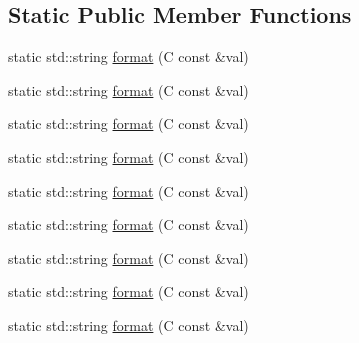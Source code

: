 \subsection*{Static Public Member Functions}
\begin{DoxyCompactItemize}
\item 
static std\+::string \mbox{\hyperlink{structfakeit_1_1Formatter_3_01C_00_01typename_01std_1_1enable__if_3_01is__ostreamable_3_01C_01_4_1_1value_01_4_1_1type_01_4_af196fc780a3f1cfe986246af4c65a718}{format}} (C const \&val)
\item 
static std\+::string \mbox{\hyperlink{structfakeit_1_1Formatter_3_01C_00_01typename_01std_1_1enable__if_3_01is__ostreamable_3_01C_01_4_1_1value_01_4_1_1type_01_4_af196fc780a3f1cfe986246af4c65a718}{format}} (C const \&val)
\item 
static std\+::string \mbox{\hyperlink{structfakeit_1_1Formatter_3_01C_00_01typename_01std_1_1enable__if_3_01is__ostreamable_3_01C_01_4_1_1value_01_4_1_1type_01_4_af196fc780a3f1cfe986246af4c65a718}{format}} (C const \&val)
\item 
static std\+::string \mbox{\hyperlink{structfakeit_1_1Formatter_3_01C_00_01typename_01std_1_1enable__if_3_01is__ostreamable_3_01C_01_4_1_1value_01_4_1_1type_01_4_af196fc780a3f1cfe986246af4c65a718}{format}} (C const \&val)
\item 
static std\+::string \mbox{\hyperlink{structfakeit_1_1Formatter_3_01C_00_01typename_01std_1_1enable__if_3_01is__ostreamable_3_01C_01_4_1_1value_01_4_1_1type_01_4_af196fc780a3f1cfe986246af4c65a718}{format}} (C const \&val)
\item 
static std\+::string \mbox{\hyperlink{structfakeit_1_1Formatter_3_01C_00_01typename_01std_1_1enable__if_3_01is__ostreamable_3_01C_01_4_1_1value_01_4_1_1type_01_4_af196fc780a3f1cfe986246af4c65a718}{format}} (C const \&val)
\item 
static std\+::string \mbox{\hyperlink{structfakeit_1_1Formatter_3_01C_00_01typename_01std_1_1enable__if_3_01is__ostreamable_3_01C_01_4_1_1value_01_4_1_1type_01_4_af196fc780a3f1cfe986246af4c65a718}{format}} (C const \&val)
\item 
static std\+::string \mbox{\hyperlink{structfakeit_1_1Formatter_3_01C_00_01typename_01std_1_1enable__if_3_01is__ostreamable_3_01C_01_4_1_1value_01_4_1_1type_01_4_af196fc780a3f1cfe986246af4c65a718}{format}} (C const \&val)
\item 
static std\+::string \mbox{\hyperlink{structfakeit_1_1Formatter_3_01C_00_01typename_01std_1_1enable__if_3_01is__ostreamable_3_01C_01_4_1_1value_01_4_1_1type_01_4_af196fc780a3f1cfe986246af4c65a718}{format}} (C const \&val)
\end{DoxyCompactItemize}


